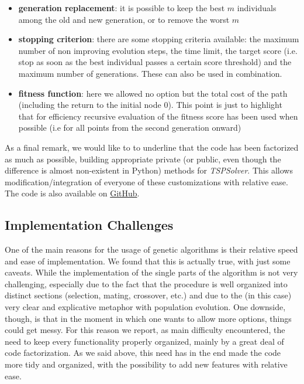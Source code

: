 \documentclass{article}
\begin{document}
\begin{itemize}
\item \textbf{generation replacement}: it is possible to keep the best $m$ individuals among the old and new generation, or to remove the worst $m$

\item \textbf{stopping criterion}: there are some stopping criteria available: the maximum number of non improving evolution steps, the time limit, the target score (i.e. stop as soon as the best individual passes a certain score threshold) and the maximum number of generations. These can also be used in combination.

\item \textbf{fitness function}: here we allowed no option but the total cost of the path (including the return to the initial node 0). This point is just to highlight that for efficiency recursive evaluation of the fitness score has been used when possible (i.e for all points from the second generation onward)
\end{itemize}
As a final remark, we would like to to underline that the code has been factorized as much as possible, building appropriate private (or public, even though the difference is almost non-existent in Python) methods for \textit{TSPSolver}. This allows modification/integration of everyone of these customizations with relative ease. The code is also available on \href{https://github.com/NRuggeriProjects/Combinatorial-Optimization}{GitHub}.

\subsection{Implementation Challenges}
One of the main reasons for the usage of genetic algorithms is their relative speed and ease of implementation. We found that this is actually true, with just some caveats. While the implementation of the single parts of the algorithm is not very challenging, especially due to the fact that the procedure is well organized into distinct sections (selection, mating, crossover, etc.) and due to the (in this case) very clear and explicative metaphor with population evolution. One downside, though, is that in the moment in which one wants to allow more options, things could get messy. For this reason we report, as main difficulty encountered, the need to keep every functionality properly organized, mainly by a great deal of code factorization. As we said above, this need has in the end made the code more tidy and organized, with the possibility to add new features with relative ease.
\end{document}
